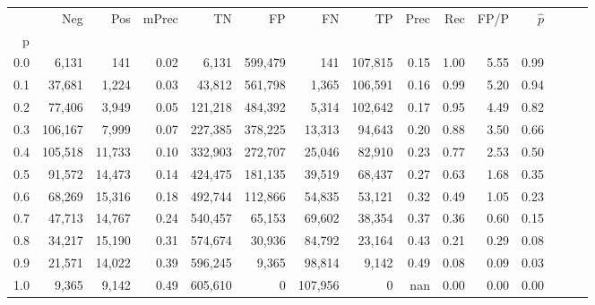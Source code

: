 \begin{tabular}{rrrrrrrrrrrrrrr}
\toprule
{} &      Neg &     Pos & mPrec &       TN &       FP &       FN &       TP &  Prec &   Rec &  FP/P & $\hat{p}$ \\
p   &          &         &       &          &          &          &          &       &       &       &           \\
\midrule
0.0 &    6,131 &     141 &  0.02 &    6,131 &  599,479 &      141 &  107,815 &  0.15 &  1.00 &  5.55 &      0.99 \\
0.1 &   37,681 &   1,224 &  0.03 &   43,812 &  561,798 &    1,365 &  106,591 &  0.16 &  0.99 &  5.20 &      0.94 \\
0.2 &   77,406 &   3,949 &  0.05 &  121,218 &  484,392 &    5,314 &  102,642 &  0.17 &  0.95 &  4.49 &      0.82 \\
0.3 &  106,167 &   7,999 &  0.07 &  227,385 &  378,225 &   13,313 &   94,643 &  0.20 &  0.88 &  3.50 &      0.66 \\
0.4 &  105,518 &  11,733 &  0.10 &  332,903 &  272,707 &   25,046 &   82,910 &  0.23 &  0.77 &  2.53 &      0.50 \\
0.5 &   91,572 &  14,473 &  0.14 &  424,475 &  181,135 &   39,519 &   68,437 &  0.27 &  0.63 &  1.68 &      0.35 \\
0.6 &   68,269 &  15,316 &  0.18 &  492,744 &  112,866 &   54,835 &   53,121 &  0.32 &  0.49 &  1.05 &      0.23 \\
0.7 &   47,713 &  14,767 &  0.24 &  540,457 &   65,153 &   69,602 &   38,354 &  0.37 &  0.36 &  0.60 &      0.15 \\
0.8 &   34,217 &  15,190 &  0.31 &  574,674 &   30,936 &   84,792 &   23,164 &  0.43 &  0.21 &  0.29 &      0.08 \\
0.9 &   21,571 &  14,022 &  0.39 &  596,245 &    9,365 &   98,814 &    9,142 &  0.49 &  0.08 &  0.09 &      0.03 \\
1.0 &    9,365 &   9,142 &  0.49 &  605,610 &        0 &  107,956 &        0 &   nan &  0.00 &  0.00 &      0.00 \\
\bottomrule
\end{tabular}
